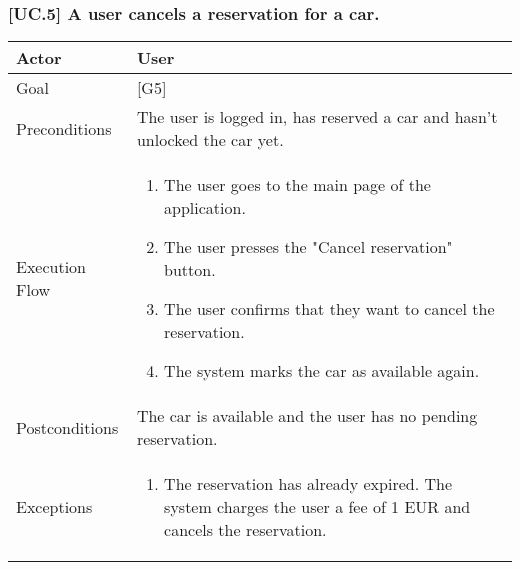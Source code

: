 \documentclass[english]{article}
\begin{document}
	\subsubsection{[UC.5] A user cancels a reservation for a car.}
	\begin{tabularx}{\textwidth}{  l  X  }
		\hline
		Actor & User\\
		\hline
		Goal & [G5]\\
		\hline
		Preconditions & The user is logged in, has reserved a car and hasn't unlocked the car yet.\\
		\hline
		Execution Flow & \begin{enumerate}
			\item{The user goes to the main page of the application.}
			\item{The user presses the "Cancel reservation" button.}
			\item{The user confirms that they want to cancel the reservation.}
			\item{The system marks the car as available again.}
		\end{enumerate}\\
		\hline
		Postconditions & The car is available and the user has no pending reservation. \\
		\hline
		Exceptions & \begin{enumerate}
			\item{The reservation has already expired. The system charges the user a fee of 1 EUR and cancels the reservation.}
		\end{enumerate}\\
		\hline
	\end{tabularx}
	
\end{document}
